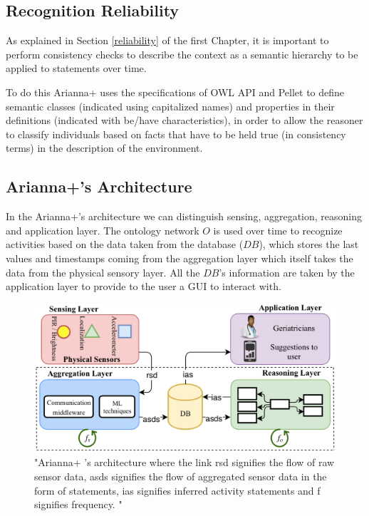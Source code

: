 \documentclass{thesisreport}
\begin{document}
 \subsection{Recognition Reliability}
 As explained in Section \ref{reliability} of the first Chapter, it is important to perform consistency checks to describe the context as a semantic hierarchy to be applied to statements over time.
 
 To do this Arianna+ uses the specifications of OWL API and Pellet to define semantic classes (indicated using capitalized names) and properties in their definitions (indicated with be/have characteristics), in order to allow the reasoner to classify individuals based on facts that have to be held true (in consistency terms) in the description of the environment.
 
 \subsection{Arianna+’s Architecture}
 In the Arianna+'s architecture we can distinguish sensing, aggregation, reasoning and application layer.  
 The ontology network $O$ is used over time to recognize activities based on the data taken from the database ($DB$), which stores the last values and timestamps coming from the aggregation layer which itself takes the data from the physical sensory layer.
 All the $DB$'s information are taken by the application layer to provide to the user a GUI to interact with.  
 
 \begin{figure}[H]
	\centering
	\includegraphics[width=17cm]{Thesis/data/layers.pdf}
	\caption{"Arianna+ ’s architecture where the link rsd signifies the flow of raw sensor data, asds signifies the flow of aggregated sensor data in the form of statements, ias signifies inferred activity statements and f signifies frequency. \cite{kareem2018arianna}"}
	\label{fig:layers}
 \end{figure}
 
\end{document}
